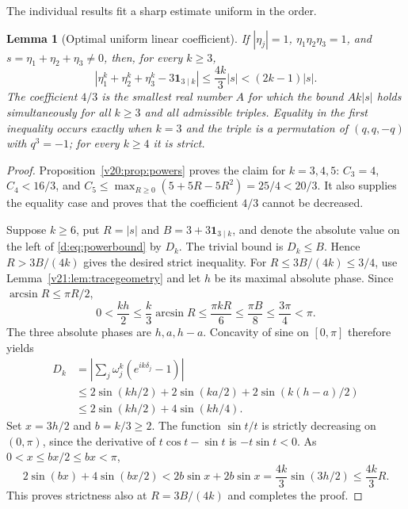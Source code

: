 \documentclass[UTF8,11pt]{ctexart}
\newtheorem{lem}[thm]{Lemma}
\theoremstyle{definition}
\numberwithin{equation}{section}
\begin{document}
The individual results fit a sharp estimate uniform in the order.
\begin{lem}[Optimal uniform linear coefficient]\label{d:lem:powers}
\label{v21:lem:uniform}
If $|\eta_j|=1$, $\eta_1\eta_2\eta_3=1$, and
$s=\eta_1+\eta_2+\eta_3\ne0$, then, for every $k\ge3$,
\begin{equation}\label{d:eq:powerbound}
 \left|\eta_1^k+\eta_2^k+\eta_3^k-3\mathbf1_{3\mid k}\right|
 \le\frac{4k}{3}|s|<(2k-1)|s|.
\end{equation}
The coefficient $4/3$ is the smallest real number $A$ for which
the bound $Ak|s|$ holds simultaneously for all $k\ge3$ and all
admissible triples. Equality in the first inequality occurs exactly
when $k=3$ and the triple is a permutation of $(q,q,-q)$ with
$q^3=-1$; for every $k\ge4$ it is strict.
\end{lem}
\begin{proof}
Proposition~\ref{v20:prop:powers} proves the claim for $k=3,4,5$:
$C_3=4$, $C_4<16/3$, and
$C_5\le\max_{R\ge0}(5+5R-5R^2)=25/4<20/3$.
It also supplies the equality case and proves that the coefficient
$4/3$ cannot be decreased.

Suppose $k\ge6$, put $R=|s|$ and
$B=3+3\mathbf1_{3\mid k}$, and denote the absolute value on the
left of \eqref{d:eq:powerbound} by $D_k$. The trivial bound is
$D_k\le B$. Hence $R>3B/(4k)$ gives the desired strict inequality.
For $R\le3B/(4k)\le3/4$, use Lemma~\ref{v21:lem:tracegeometry}
and let $h$ be its maximal absolute phase. Since
$\arcsin R\le\pi R/2$,
\[
 0<\frac{kh}{2}\le\frac{k}{3}\arcsin R
       \le\frac{\pi kR}{6}\le\frac{\pi B}{8}
       \le\frac{3\pi}{4}<\pi.
\]
The three absolute phases are $h,a,h-a$. Concavity of sine on
$[0,\pi]$ therefore yields
\begin{equation}\label{d:eq:smallpower}
 \begin{split}
 D_k&=\left|\sum_j\omega_j^k(e^{ik\delta_j}-1)\right|\\
    &\le2\sin(kh/2)+2\sin(ka/2)+2\sin(k(h-a)/2)\\
    &\le2\sin(kh/2)+4\sin(kh/4).
 \end{split}
\end{equation}
Set $x=3h/2$ and $b=k/3\ge2$. The function $\sin t/t$ is
strictly decreasing on $(0,\pi)$, since the derivative of
$t\cos t-\sin t$ is $-t\sin t<0$. As $0<x\le bx/2\le bx<\pi$,
\[
 2\sin(bx)+4\sin(bx/2)
       < 2b\sin x+2b\sin x
       =\frac{4k}{3}\sin(3h/2)
       \le\frac{4k}{3}R.
\]
This proves strictness also at $R=3B/(4k)$ and completes the proof.
\end{proof}
\end{document}
